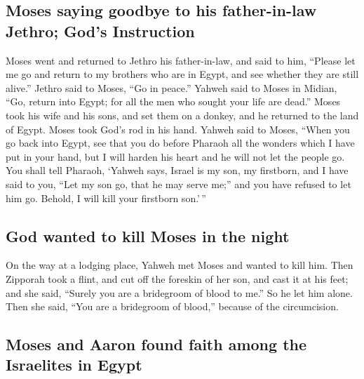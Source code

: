 \hypertarget{moses-saying-goodbye-to-his-father-in-law-jethro-gods-instruction}{%
\subsection{Moses saying goodbye to his father-in-law Jethro; God's
Instruction}\label{moses-saying-goodbye-to-his-father-in-law-jethro-gods-instruction}}

 Moses went and returned to Jethro his father-in-law, and
said to him, ``Please let me go and return to my brothers who are in
Egypt, and see whether they are still alive.'' Jethro said to Moses,
``Go in peace.''  Yahweh said to Moses in Midian, ``Go,
return into Egypt; for all the men who sought your life are dead.''
 Moses took his wife and his sons, and set them on a
donkey, and he returned to the land of Egypt. Moses took God's rod in
his hand.  Yahweh said to Moses, ``When you go back into
Egypt, see that you do before Pharaoh all the wonders which I have put
in your hand, but I will harden his heart and he will not let the people
go.  You shall tell Pharaoh, `Yahweh says, Israel is my
son, my firstborn,  and I have said to you, ``Let my son
go, that he may serve me;'' and you have refused to let him go. Behold,
I will kill your firstborn son.'\,''

\hypertarget{god-wanted-to-kill-moses-in-the-night}{%
\subsection{God wanted to kill Moses in the
night}\label{god-wanted-to-kill-moses-in-the-night}}

 On the way at a lodging place, Yahweh met Moses and
wanted to kill him.  Then Zipporah took a flint, and cut
off the foreskin of her son, and cast it at his feet; and she said,
``Surely you are a bridegroom of blood to me.''  So he
let him alone. Then she said, ``You are a bridegroom of blood,'' because
of the circumcision.

\hypertarget{moses-and-aaron-found-faith-among-the-israelites-in-egypt}{%
\subsection{Moses and Aaron found faith among the Israelites in
Egypt}\label{moses-and-aaron-found-faith-among-the-israelites-in-egypt}}

